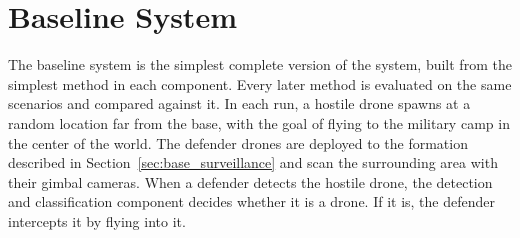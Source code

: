 \section{Baseline System}\label{sec:baseline}
The baseline system is the simplest complete version of the system, built
from the simplest method in each component. Every later method is evaluated
on the same scenarios and compared against it. In each run, a hostile drone spawns at a random location far from the base, with the goal of flying to the military camp in the center of the world. The defender drones are deployed to the formation described in Section~\ref{sec:base_surveillance} and scan the surrounding area with their gimbal cameras. When a defender detects the hostile drone, the detection and classification component decides whether it is a drone. If it is, the defender intercepts it by flying into it.

